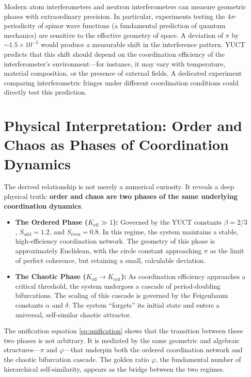 \documentclass[12pt,a4paper]{article}
\begin{document}
{	Modern atom interferometers and neutron interferometers can measure geometric phases with extraordinary precision. In particular, experiments testing the \(4\pi\)-periodicity of spinor wave functions (a fundamental prediction of quantum mechanics) are sensitive to the effective geometry of space. A deviation of \(\pi\) by \(\sim 1.5\times10^{-5}\) would produce a measurable shift in the interference pattern. YUCT predicts that this shift should depend on the coordination efficiency of the interferometer's environment—for instance, it may vary with temperature, material composition, or the presence of external fields. A dedicated experiment comparing interferometric fringes under different coordination conditions could directly test this prediction.
	
	\section{Physical Interpretation: Order and Chaos as Phases of Coordination Dynamics}
	
	The derived relationship is not merely a numerical curiosity. It reveals a deep physical truth: \textbf{order and chaos are two phases of the same underlying coordination dynamics}.
	
	\begin{itemize}
		\item \textbf{The Ordered Phase (\(K_{\mathrm{eff}} \gg 1\)):} Governed by the YUCT constants \(\beta = 2/3\), \(S_{\mathrm{odd}} = 1.2\), and \(S_{\mathrm{even}} = 0.8\). In this regime, the system maintains a stable, high-efficiency coordination network. The geometry of this phase is approximately Euclidean, with the circle constant approaching \(\pi\) as the limit of perfect coherence, but retaining a small, calculable deviation.
		
		\item \textbf{The Chaotic Phase (\(K_{\mathrm{eff}} \to K_{\mathrm{crit}}\)):} As coordination efficiency approaches a critical threshold, the system undergoes a cascade of period-doubling bifurcations. The scaling of this cascade is governed by the Feigenbaum constants \(\alpha\) and \(\delta\). The system ``forgets'' its initial state and enters a universal, self-similar chaotic attractor.
	\end{itemize}
	
	The unification equation \eqref{eq:unification} shows that the transition between these two phases is not arbitrary. It is mediated by the same geometric and algebraic structures---\(\pi\) and \(\varphi\)---that underpin both the ordered coordination network and the chaotic bifurcation cascade. The golden ratio \(\varphi\), the fundamental number of hierarchical self-similarity, appears as the bridge between the two regimes.
	
}
\end{document}
